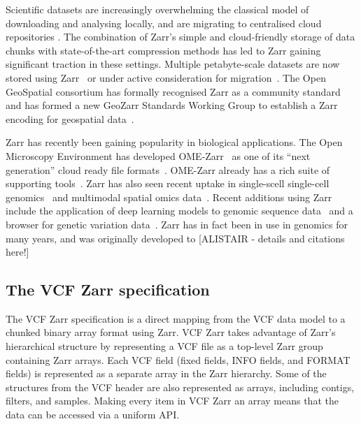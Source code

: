 \documentclass[a4paper,num-refs]{oup-contemporary}
\begin{document}
Scientific datasets are increasingly overwhelming the classical
model of downloading and analysing locally, and are migrating to 
centralised cloud repositories \citep{abernathey2021cloud,moore2021ome}.
The combination of Zarr's simple and cloud-friendly storage 
of data chunks with state-of-the-art compression methods has 
led to Zarr gaining significant traction in these settings.
Multiple petabyte-scale datasets are now stored using 
Zarr~\cite[e.g.][]{gowan2022using, %
fahnestock2023mappin, %
cmip6_dataset}
or under active consideration for migration~\citep{durbin2020task,abernathey2021opening}.
The Open GeoSpatial consortium has formally recognised Zarr as a community
standard~\cite{ogc_zarr2_standard}
and has formed
a new GeoZarr Standards Working Group to establish a Zarr encoding for
geospatial data~\cite{ogc_geozarr_news}.

Zarr has recently been gaining popularity in biological applications.
The Open Microscopy Environment has developed OME-Zarr~\cite{moore2023ome} as one 
of its ``next generation'' cloud ready file formats~\citep{moore2021ome}.
OME-Zarr already has a rich suite of supporting
tools~\cite{moore2023ome,rzepka2023toward}. 
Zarr has also seen recent uptake 
in single-scell single-cell genomics~\citep{dhapola2022scarf,virshup2023scverse}
and multimodal spatial omics
data~\citep{marconato2024spatialdata,baker2023emobject}.
Recent additions using Zarr include the application of deep learning
models to genomic sequence data~\citep{klie2023predictive} 
and a browser for genetic variation data~\citep{konig2023divbrowse}.
Zarr has in fact been in use in genomics for many years, and was originally 
developed to [ALISTAIR - details and citations here!]

\subsection{The VCF Zarr specification}
The VCF Zarr specification is a direct mapping from the VCF data model
to a chunked binary array format using Zarr. VCF Zarr takes advantage
of Zarr's hierarchical structure by representing a VCF file as a top-level
Zarr group containing Zarr arrays. Each VCF field (fixed fields, INFO fields,
and FORMAT fields) is represented as a separate array in the Zarr hierarchy.
Some of the structures from the VCF header are also represented as arrays,
including contigs, filters, and samples. Making every item in VCF Zarr an
array means that the data can be accessed via a uniform API.
\end{document}
